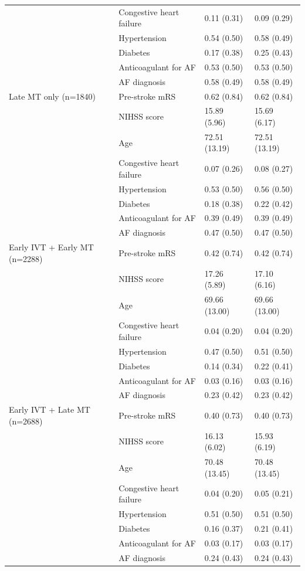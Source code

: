 {\begin{longtable}[]{@{}llll@{}}
& Congestive heart failure & 0.11 (0.31) & 0.09 (0.29) \\
& Hypertension & 0.54 (0.50) & 0.58 (0.49) \\
& Diabetes & 0.17 (0.38) & 0.25 (0.43) \\
& Anticoagulant for AF & 0.53 (0.50) & 0.53 (0.50) \\
& AF diagnosis & 0.58 (0.49) & 0.58 (0.49) \\
Late MT only (n=1840) & Pre-stroke mRS & 0.62 (0.84) & 0.62 (0.84) \\
& NIHSS score & 15.89 (5.96) & 15.69 (6.17) \\
& Age & 72.51 (13.19) & 72.51 (13.19) \\
& Congestive heart failure & 0.07 (0.26) & 0.08 (0.27) \\
& Hypertension & 0.53 (0.50) & 0.56 (0.50) \\
& Diabetes & 0.18 (0.38) & 0.22 (0.42) \\
& Anticoagulant for AF & 0.39 (0.49) & 0.39 (0.49) \\
& AF diagnosis & 0.47 (0.50) & 0.47 (0.50) \\
Early IVT + Early MT (n=2288) & Pre-stroke mRS & 0.42 (0.74) & 0.42 (0.74) \\
& NIHSS score & 17.26 (5.89) & 17.10 (6.16) \\
& Age & 69.66 (13.00) & 69.66 (13.00) \\
& Congestive heart failure & 0.04 (0.20) & 0.04 (0.20) \\
& Hypertension & 0.47 (0.50) & 0.51 (0.50) \\
& Diabetes & 0.14 (0.34) & 0.22 (0.41) \\
& Anticoagulant for AF & 0.03 (0.16) & 0.03 (0.16) \\
& AF diagnosis & 0.23 (0.42) & 0.23 (0.42) \\
Early IVT + Late MT (n=2688) & Pre-stroke mRS & 0.40 (0.73) & 0.40 (0.73) \\
& NIHSS score & 16.13 (6.02) & 15.93 (6.19) \\
& Age & 70.48 (13.45) & 70.48 (13.45) \\
& Congestive heart failure & 0.04 (0.20) & 0.05 (0.21) \\
& Hypertension & 0.51 (0.50) & 0.51 (0.50) \\
& Diabetes & 0.16 (0.37) & 0.21 (0.41) \\
& Anticoagulant for AF & 0.03 (0.17) & 0.03 (0.17) \\
& AF diagnosis & 0.24 (0.43) & 0.24 (0.43) \\

\end{longtable}}
